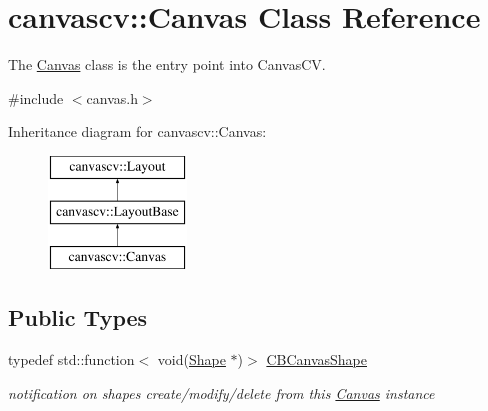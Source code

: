 \hypertarget{classcanvascv_1_1Canvas}{}\section{canvascv\+:\+:Canvas Class Reference}
\label{classcanvascv_1_1Canvas}


The \hyperlink{classcanvascv_1_1Canvas}{Canvas} class is the entry point into Canvas\+CV.  




{\ttfamily \#include $<$canvas.\+h$>$}

Inheritance diagram for canvascv\+:\+:Canvas\+:\begin{figure}[H]
\begin{center}
\leavevmode
\includegraphics[height=3.000000cm]{classcanvascv_1_1Canvas}
\end{center}
\end{figure}
\subsection*{Public Types}
\begin{DoxyCompactItemize}
\item 
typedef std\+::function$<$ void(\hyperlink{classcanvascv_1_1Shape}{Shape} $\ast$)$>$ \hyperlink{classcanvascv_1_1Canvas_a6436ebb5dbadc3dbf9de3da8a499cf44}{C\+B\+Canvas\+Shape}\hypertarget{classcanvascv_1_1Canvas_a6436ebb5dbadc3dbf9de3da8a499cf44}{}\label{classcanvascv_1_1Canvas_a6436ebb5dbadc3dbf9de3da8a499cf44}

\begin{DoxyCompactList}\small\item\em notification on shapes create/modify/delete from this \hyperlink{classcanvascv_1_1Canvas}{Canvas} instance \end{DoxyCompactList}\end{DoxyCompactItemize}

